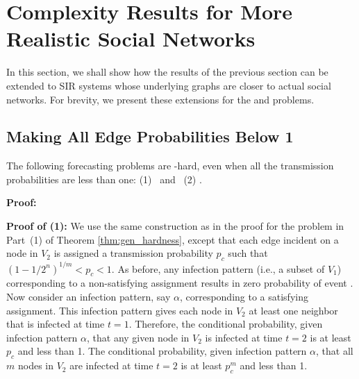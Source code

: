   
\section{Complexity Results for More Realistic Social Networks}
\label{sec:realistic}


In this section, we shall show how the results of the 
previous section can be extended to SIR systems whose
underlying graphs are closer to actual social networks. 
For brevity, we present these extensions for the 
\tNewInfv{} and \tTotInfv{} problems. 


\subsection{Making All Edge Probabilities Below 1}


\begin{theorem}\label{thm:gen_hardness_prob_not_one}
The following forecasting problems are \cnump-hard,
even when all the transmission probabilities are less than one:
(1) \TwoNewInfv{} ~and~
(2)  \TwoTotInfv{}.
\end{theorem}

\noindent
\textbf{Proof:}~  

\noindent
\textbf{Proof of (1):}
We use the same construction as in the proof for the \TwoNewInfv{} problem 
in Part~(1) of Theorem \ref{thm:gen_hardness}, 
except that each edge incident on a node in $V_2$ is 
assigned a transmission probability $p_c$ such that 
$( 1 - 1/2^n)^{1/m} < p_c <1$.  
As before, any infection pattern (i.e., a subset of $V_1$)
corresponding to a non-satisfying
assignment results in zero probability of event \cale{}.  
Now consider an infection pattern, say $\alpha$,
corresponding to a satisfying assignment.
This infection pattern  gives each
node in $V_2$ at least one neighbor that is infected at time $t =
1$.  Therefore, the conditional probability, given infection pattern
$\alpha$, that any given node in $V_2$ is infected at time $t = 2$
is at least $p_c$ and less than 1.  
The conditional probability,
given infection pattern $\alpha$, that all $m$ nodes in $V_2$ are
infected at time $t = 2$ is at least $p_c^m$ and less than 1.

